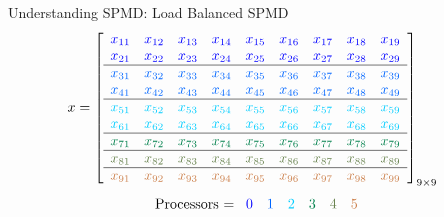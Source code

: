 \begin{frame}
\begin{exampleblock}{Understanding SPMD:  Load Balanced SPMD}
\begin{align*}
x &= \left[
      \begin{array}{lllllllll}
      \color{g11}x_{11} & \color{g11}x_{12} & \color{g11}x_{13} & \color{g11}x_{14} & \color{g11}x_{15} & \color{g11}x_{16} & \color{g11}x_{17} & \color{g11}x_{18} & \color{g11}x_{19}\\
      \color{g11}x_{21} & \color{g11}x_{22} & \color{g11}x_{23} & \color{g11}x_{24} & \color{g11}x_{25} & \color{g11}x_{26} & \color{g11}x_{27} & \color{g11}x_{28} & \color{g11}x_{29}\\\hline
      \color{g12}x_{31} & \color{g12}x_{32} & \color{g12}x_{33} & \color{g12}x_{34} & \color{g12}x_{35} & \color{g12}x_{36} & \color{g12}x_{37} & \color{g12}x_{38} & \color{g12}x_{39}\\
      \color{g12}x_{41} & \color{g12}x_{42} & \color{g12}x_{43} & \color{g12}x_{44} & \color{g12}x_{45} & \color{g12}x_{46} & \color{g12}x_{47} & \color{g12}x_{48} & \color{g12}x_{49}\\\hline
      \color{g13}x_{51} & \color{g13}x_{52} & \color{g13}x_{53} & \color{g13}x_{54} & \color{g13}x_{55} & \color{g13}x_{56} & \color{g13}x_{57} & \color{g13}x_{58} & \color{g13}x_{59}\\
      \color{g13}x_{61} & \color{g13}x_{62} & \color{g13}x_{63} & \color{g13}x_{64} & \color{g13}x_{65} & \color{g13}x_{66} & \color{g13}x_{67} & \color{g13}x_{68} & \color{g13}x_{69}\\\hline
      \color{g21}x_{71} & \color{g21}x_{72} & \color{g21}x_{73} & \color{g21}x_{74} & \color{g21}x_{75} & \color{g21}x_{76} & \color{g21}x_{77} & \color{g21}x_{78} & \color{g21}x_{79}\\\hline
      \color{g22}x_{81} & \color{g22}x_{82} & \color{g22}x_{83} & \color{g22}x_{84} & \color{g22}x_{85} & \color{g22}x_{86} & \color{g22}x_{87} & \color{g22}x_{88} & \color{g22}x_{89}\\\hline
      \color{g23}x_{91} & \color{g23}x_{92} & \color{g23}x_{93} & \color{g23}x_{94} & \color{g23}x_{95} & \color{g23}x_{96} & \color{g23}x_{97} & \color{g23}x_{98} & \color{g23}x_{99}\\
      \end{array}
\right]_{9\times 9}
\end{align*}
\begin{align*}
\text{Processors = }
      \begin{array}{llllll}
      \color{g11}0 & \color{g12}1 & \color{g13}2 & \color{g21}3 & \color{g22}4 & \color{g23}5
      \end{array}
\end{align*}
\end{exampleblock}
\end{frame}

